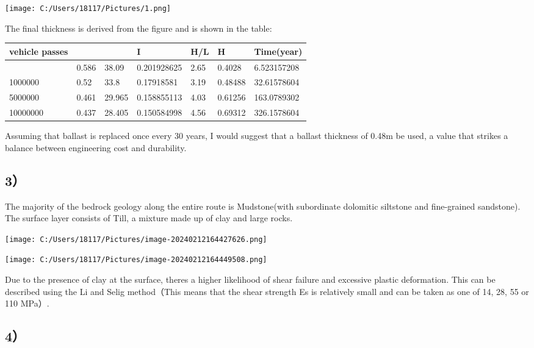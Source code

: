 \documentclass[
]{article}
\begin{document}
\texttt{[image: C:/Users/18117/Pictures/1.png]}

The final thickness is derived from the figure and is shown in the
table:

\begin{longtable}[]{@{}lllllll@{}}
\toprule\noalign{}
vehicle passes & & & I & H/L & H & Time(year) \\
\midrule\noalign{}
\endhead
\bottomrule\noalign{}
\endlastfoot
200000 & 0.586 & 38.09 & 0.201928625 & 2.65 & 0.4028 & 6.523157208 \\
1000000 & 0.52 & 33.8 & 0.17918581 & 3.19 & 0.48488 & 32.61578604 \\
5000000 & 0.461 & 29.965 & 0.158855113 & 4.03 & 0.61256 & 163.0789302 \\
10000000 & 0.437 & 28.405 & 0.150584998 & 4.56 & 0.69312 &
326.1578604 \\
\end{longtable}

Assuming that ballast is replaced once every 30 years, I would suggest
that a ballast thickness of 0.48m be used, a value that strikes a
balance between engineering cost and durability.

\subsection{3）}\label{3uxff09}

The majority of the bedrock geology along the entire route is
Mudstone(with subordinate dolomitic siltstone and fine-grained
sandstone). The surface layer consists of Till, a mixture made up of
clay and large rocks.

\texttt{[image: C:/Users/18117/Pictures/image-20240212164427626.png]}

\texttt{[image: C:/Users/18117/Pictures/image-20240212164449508.png]}

Due to the presence of clay at the surface, there\textquotesingle s a
higher likelihood of shear failure and excessive plastic deformation.
This can be described using the Li and Selig method（This means that the
shear strength Es is relatively small and can be taken as one of 14, 28,
55 or 110 MPa）.

\subsection{4）}\label{4uxff09}
\end{document}
